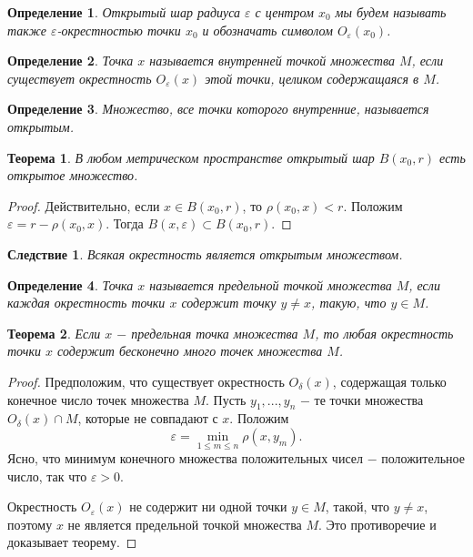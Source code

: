 \documentclass{article}
\newtheorem{theorem}{Теорема}[section]
\newtheorem{definition}{Определение}[section]
\newtheorem*{consequence}{Следствие}
\begin{document}
\begin{definition}
Открытый шар радиуса \(\varepsilon\) с центром \(x_0\) мы будем называть также \(\varepsilon\)-окрестностью точки \(x_0\) и обозначать символом \(O_\varepsilon(x_0)\).
\end{definition}

\begin{definition}
Точка \(x\) называется внутренней точкой множества \(M\), если существует окрестность \(O_\varepsilon(x)\) этой точки, целиком содержащаяся в \(M\).
\end{definition}

\begin{definition}
Множество, все точки которого внутренние, называется открытым.
\end{definition}

\begin{theorem}
В любом метрическом пространстве открытый шар \(B(x_0, r)\) есть открытое множество.
\end{theorem}

\begin{proof}
Действительно, если \(x \in B(x_0, r)\), то \(\rho(x_0, x) < r\). Положим \(\varepsilon = r - \rho(x_0, x)\). Тогда \(B(x, \varepsilon) \subset B(x_0, r)\).
\end{proof}

\begin{consequence}
Всякая окрестность является открытым множеством.
\end{consequence}

\begin{definition}
Точка \(x\) называется предельной точкой множества \(M\), если каждая окрестность точки \(x\) содержит точку \(y \neq x\), такую, что \(y \in M\).
\end{definition}

\begin{theorem}
Если \(x\) \(-\) предельная точка множества \(M\), то любая окрестность точки \(x\) содержит бесконечно много точек множества \(M\).
\end{theorem}

\begin{proof}
Предположим, что существует окрестность \(O_\delta(x)\), содержащая только конечное число точек множества \(M\). Пусть \(y_1, ..., y_n\) \(-\) те точки множества \(O_\delta(x) \cap M\), которые не совпадают с \(x\). Положим
\[
\varepsilon = \min_{1 \leq m \leq n}{\rho(x, y_m)}.
\]
Ясно, что минимум конечного множества положительных чисел \(-\) положительное число, так что \(\varepsilon > 0\).

Окрестность \(O_\varepsilon(x)\) не содержит ни одной точки \(y \in M\), такой, что \(y \neq x\), поэтому \(x\) не является предельной точкой множества \(M\). Это противоречие и доказывает теорему.
\end{proof}
\end{document}
